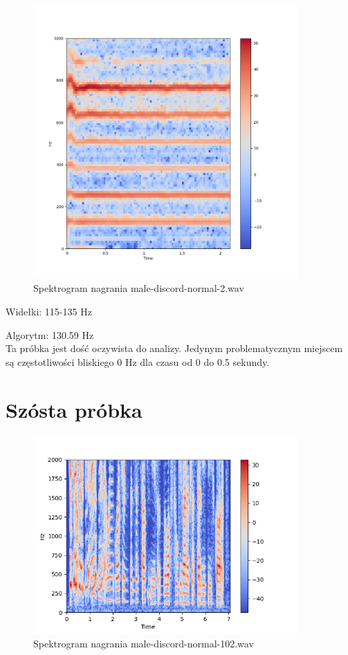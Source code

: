 \documentclass[a4paper,12pt]{extarticle}
\begin{document}
\begin{figure}[h!]
\centering
\includegraphics[width=0.9\textwidth]{male-discord-normal-2}
\caption{Spektrogram nagrania male-discord-normal-2.wav}
\end{figure}

\noindent Widełki: 115-135 Hz

\noindent Algorytm: 130.59 Hz\\

\noindent Ta próbka jest dość oczywista do analizy. Jedynym problematycznym miejscem są częstotliwości bliskiego 0 Hz dla czasu od 0 do 0.5 sekundy.

\clearpage

\section*{Szósta próbka}

\begin{figure}[h!]
\centering
\includegraphics[width=0.9\textwidth]{male-discord-normal-102}
\caption{Spektrogram nagrania male-discord-normal-102.wav}
\end{figure}
\end{document}
